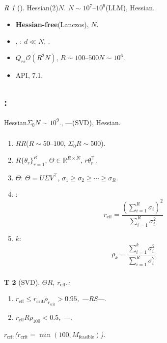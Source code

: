 \documentclass[12pt,a4paper]{article}
\newtheorem{theorem}Theorem[section]
\theoremstyle{remark}
\newtheorem{remark}[theorem]Remark
\begin{document}
\subsection{}
\begin{remark}[]
Hessian(2)$N$.
$N \sim 10^7\text{--}10^9$(LLM), Hessian.
\begin{itemize}[itemsep=2pt]
    \item \textbf{Hessian-free}(Lanczos), $N$.
    \item , \textbf{}: $d \ll N$, .
    \item $Q_{rs}$$\mathcal{O}(R^2 N)$, $R \sim 100\text{--}500$$N \sim 10^6$.
    \item API, 7.1.
\end{itemize}
\end{remark}
\subsection{:}
Hessian$\Sigma_0$$N \sim 10^9$., ---(SVD), Hessian.
\subsubsection{}
\begin{enumerate}[label=\textbf{ \arabic*},leftmargin=*,itemsep=6pt]
    \item $R$$R$($R \sim 50\text{--}100$, $\Sigma_0$$R \sim 500$).
    \item $R$$\{\theta_r\}_{r=1}^{R}$, $\Theta \in \mathbb{R}^{R \times N}$, $r$$\theta_r^\top$.
    \item $\Theta$: $\Theta = U \Sigma V^\top$, $\sigma_1 \geq \sigma_2 \geq \cdots \geq \sigma_R$.
    \item \textbf{}: 
    \begin{equation}
        r_{\text{eff}} = \frac{(\sum_{i=1}^{R} \sigma_i)^2}{\sum_{i=1}^{R} \sigma_i^2}
    \end{equation}
    \item $k$: 
    \begin{equation}
        \rho_k = \frac{\sum_{i=1}^{k} \sigma_i^2}{\sum_{i=1}^{R} \sigma_i^2}
    \end{equation}
\end{enumerate}
\subsubsection{}
\begin{theorem}[SVD]\label{thm:svd_rank}
$\Theta$$R$, $r_{\text{eff}}$.: 
\begin{enumerate}[label=(\roman*),itemsep=3pt]
    \item $r_{\text{eff}} \leq r_{\text{crit}}$$\rho_{r_{\text{crit}}} > 0.95$, ---RS---\textbf{}.
    \item $r_{\text{eff}}$$R$$\rho_{100} < 0.5$, ---\textbf{}.
\end{enumerate}
$r_{\text{crit}}$($r_{\text{crit}} = \min(100, M_{\text{feasible}})$).
\end{theorem}
\end{document}
